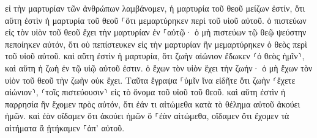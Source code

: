 \documentclass{openreader}
\begin{document}
εἰ τὴν μαρτυρίαν τῶν ἀνθρώπων λαμβάνομεν, ἡ μαρτυρία τοῦ θεοῦ μείζων ἐστίν, ὅτι αὕτη ἐστὶν ἡ μαρτυρία τοῦ θεοῦ ⸀ὅτι μεμαρτύρηκεν περὶ τοῦ υἱοῦ αὐτοῦ. ὁ πιστεύων εἰς τὸν υἱὸν τοῦ θεοῦ ἔχει τὴν μαρτυρίαν ἐν ⸀αὑτῷ· ὁ μὴ πιστεύων τῷ θεῷ ψεύστην πεποίηκεν αὐτόν, ὅτι οὐ πεπίστευκεν εἰς τὴν μαρτυρίαν ἣν μεμαρτύρηκεν ὁ θεὸς περὶ τοῦ υἱοῦ αὐτοῦ. καὶ αὕτη ἐστὶν ἡ μαρτυρία, ὅτι ζωὴν αἰώνιον ἔδωκεν ⸂ὁ θεὸς ἡμῖν⸃, καὶ αὕτη ἡ ζωὴ ἐν τῷ υἱῷ αὐτοῦ ἐστιν. ὁ ἔχων τὸν υἱὸν ἔχει τὴν ζωήν· ὁ μὴ ἔχων τὸν υἱὸν τοῦ θεοῦ τὴν ζωὴν οὐκ ἔχει. Ταῦτα ἔγραψα ⸀ὑμῖν ἵνα εἰδῆτε ὅτι ζωὴν ⸂ἔχετε αἰώνιον⸃, ⸂τοῖς πιστεύουσιν⸃ εἰς τὸ ὄνομα τοῦ υἱοῦ τοῦ θεοῦ. καὶ αὕτη ἐστὶν ἡ παρρησία ἣν ἔχομεν πρὸς αὐτόν, ὅτι ἐάν τι αἰτώμεθα κατὰ τὸ θέλημα αὐτοῦ ἀκούει ἡμῶν. καὶ ἐὰν οἴδαμεν ὅτι ἀκούει ἡμῶν ὃ ⸀ἐὰν αἰτώμεθα, οἴδαμεν ὅτι ἔχομεν τὰ αἰτήματα ἃ ᾐτήκαμεν ⸀ἀπ’ αὐτοῦ. 
\end{document}
